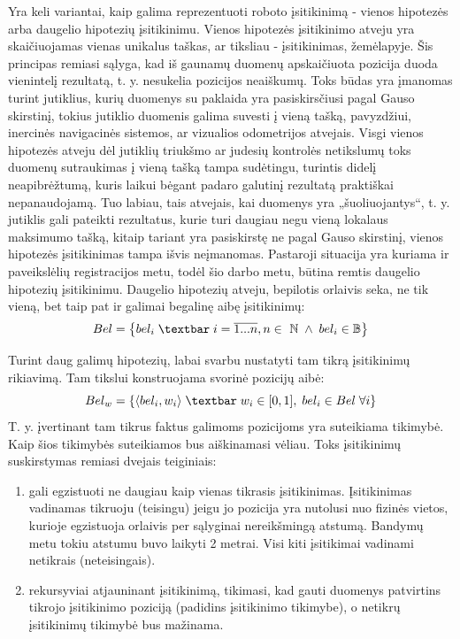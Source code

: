 \documentclass[a4paper,12pt]{article}
\begin{document}
		Yra keli variantai, kaip galima reprezentuoti roboto įsitikinimą - vienos hipotezės arba daugelio hipotezių įsitikinimu. Vienos hipotezės įsitikinimo atveju yra skaičiuojamas vienas unikalus taškas, ar tiksliau - įsitikinimas,  žemėlapyje. Šis principas remiasi sąlyga, kad iš gaunamų duomenų apskaičiuota pozicija duoda vienintelį rezultatą, t. y. nesukelia pozicijos neaiškumų. Toks būdas yra įmanomas turint jutiklius, kurių duomenys su paklaida yra pasiskirsčiusi pagal Gauso skirstinį, tokius jutiklio duomenis galima suvesti į vieną tašką, pavyzdžiui, inercinės navigacinės sistemos, ar vizualios odometrijos atvejais. Visgi vienos hipotezės atveju dėl jutiklių triukšmo ar judesių kontrolės netikslumų toks duomenų sutraukimas į vieną tašką tampa sudėtingu, turintis didelį neapibrėžtumą, kuris laikui bėgant padaro galutinį rezultatą praktiškai nepanaudojamą. Tuo labiau, tais atvejais, kai duomenys yra „šuoliuojantys“, t. y. jutiklis gali pateikti rezultatus, kurie turi daugiau negu vieną lokalaus maksimumo tašką, kitaip tariant yra pasiskirstę ne pagal Gauso skirstinį, vienos hipotezės įsitikinimas tampa išvis neįmanomas. Pastaroji situacija yra kuriama ir paveikslėlių registracijos metu, todėl šio darbo metu, būtina remtis daugelio hipotezių įsitikinimu. Daugelio hipotezių atveju, bepilotis orlaivis seka, ne tik vieną, bet taip pat ir galimai begalinę aibę įsitikinimų:
		\begin{equation}
			Bel = \left\{ bel_i \; \textbar\;  i = \overline{1...n},n \in \ \mathbb{N}\; \land \;  bel_i \in \mathbb{B} \right\}
		\end{equation}
	
		Turint daug galimų hipotezių, labai svarbu nustatyti tam tikrą įsitikinimų rikiavimą. Tam tikslui konstruojama svorinė pozicijų aibė: 
		\begin{equation}
		Bel_w = \left\{ \langle bel_i, w_i \rangle \; \textbar\;  w_i \in [0,1], \; bel_i \in Bel \; \forall i \right\}
		\end{equation}
		T. y. įvertinant tam tikrus faktus galimoms pozicijoms yra suteikiama tikimybė. Kaip šios tikimybės suteikiamos bus aiškinamasi vėliau. Toks įsitikinimų suskirstymas remiasi dvejais teiginiais:
		\begin{enumerate}[1.]
			\item gali egzistuoti ne daugiau kaip vienas tikrasis įsitikinimas.
				Įsitikinimas vadinamas tikruoju (teisingu) jeigu jo pozicija yra nutolusi nuo fizinės vietos, kurioje egzistuoja orlaivis per sąlyginai nereikšmingą atstumą. Bandymų metu tokiu atstumu buvo laikyti 2 metrai. Visi kiti įsitikimai vadinami netikrais (neteisingais).
			\item rekursyviai atjauninant įsitikinimą, tikimasi, kad gauti duomenys patvirtins tikrojo įsitikinimo poziciją (padidins įsitikinimo tikimybe), o netikrų įsitikinimų tikimybė bus mažinama.
		\end{enumerate}
				
\end{document}
